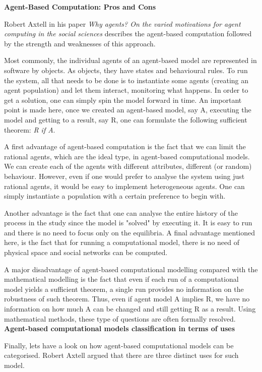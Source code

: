 \documentclass[../main.tex]{subfiles}
\begin{document}
\textbf{Agent-Based Computation: Pros and Cons}

Robert Axtell in his paper \textit{Why agents? On the varied motivations for agent computing in the social sciences} \cite[]{whyAgents} describes the agent-based computation followed by the strength and weaknesses of this approach.

Most commonly, the individual agents of an agent-based model are represented in software by objects. As objects, they have states and behavioural rules. To run the system, all that needs to be done is to instantiate some agents (creating an agent population) and let them interact, monitoring what happens. In order to get a solution, one can simply spin the model forward in time. An important point is made here, once we created an agent-based model, say A, executing the model and getting to a result, say R, one can formulate the following sufficient theorem: \textit{R if A}.

A first advantage of agent-based computation is the fact that we can limit the rational agents, which are the ideal type, in agent-based computational models. We can create each of the agents with different attributes, different (or random) behaviour. However, even if one would prefer to analyse the system using just rational agents, it would be easy to implement heterogeneous agents. One can simply instantiate a population with a certain preference to begin with.

Another advantage is the fact that one can analyse the entire history of the process in the study since the model is "solved" by executing it. It is easy to run and there is no need to focus only on the equilibria. A final advantage mentioned here, is the fact that for running a computational model, there is no need of physical space and social networks can be computed. 

A major disadvantage of agent-based computational modelling compared with the mathematical modelling is the fact that even if each run of a computational model yields a sufficient theorem, a single run provides no information on the robustness of such theorem. Thus, even if agent model A implies R, we have no information on how much A can be changed and still getting R as a result. Using mathematical methods, these type of questions are often formally resolved.\\

\textbf{Agent-based computational models classification in terms of uses}

Finally, lets have a look on how agent-based computational models can be  categorised. Robert Axtell argued that there are three distinct uses for such model.
\end{document}
